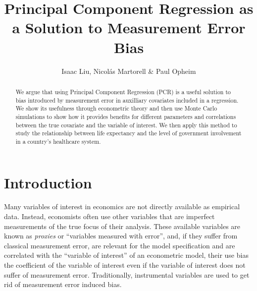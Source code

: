 \documentclass[10pt]{article}
\begin{document}
    \thispagestyle{firststyle}

    \author{Isaac Liu, Nicol\'as Martorell \& Paul Opheim}
    \title{Principal Component Regression as a Solution to Measurement Error Bias} 
    \maketitle



    \begin{abstract}

        We argue that using Principal Component Regression (PCR) is a useful solution to bias introduced by measurement error in auxilliary covariates included in a regression. We show its usefulness through econometric theory and then use Monte Carlo simulations to show how it provides benefits for different parameters and correlations between the true covariate and the variable of interest. We then apply this method to study the relationship between life expectancy and the level of government involvement in a country's healthcare system.
        
    \end{abstract}

    \newpage \clearpage

    \section*{Introduction}

        Many variables of interest in economics are not directly available as empirical data. Instead, economists often use other variables that are imperfect measurements of the true focus of their analysis. These available variables are known as \textit{proxies} or ``variables measured with error'', and, if they suffer from classical measurement error, are relevant for the model specification and are correlated with the ``variable of interest'' of an econometric model, their use bias the coefficient of the variable of interest even if the variable of interest does not suffer of measurement error. Traditionally, instrumental variables are used to get rid of measurement error induced bias.
\end{document}

